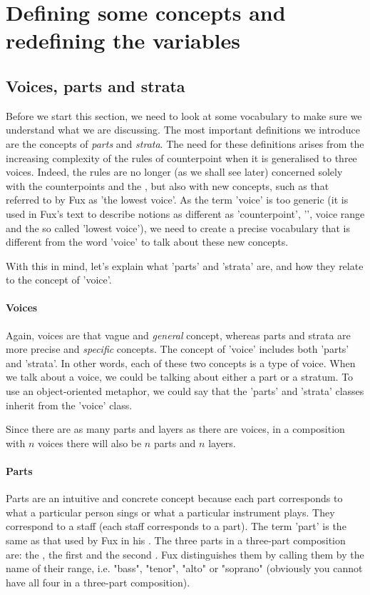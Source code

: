 \chapter{Defining some concepts and redefining the variables} \label{chapter:defining-some-concepts-and-redifing-the-variables}
\section{Voices, parts and strata}\label{section:parts-and-strata}
Before we start this section, we need to look at some vocabulary to make sure we understand what we are discussing. The most important definitions we introduce are the concepts of \textit{parts} and \textit{strata}. The need for these definitions arises from the increasing complexity of the rules of counterpoint when it is generalised to three voices. Indeed, the rules are no longer (as we shall see later) concerned solely with the counterpoints and the \cf, but also with new concepts, such as that referred to by Fux as 'the lowest voice'. As the term 'voice' is too generic (it is used in Fux's text to describe notions as different as 'counterpoint', '\cf', voice range and the so called 'lowest voice'), we need to create a precise vocabulary that is different from the word 'voice' to talk about these new concepts. 


With this in mind, let's explain what 'parts' and 'strata' are, and how they relate to the concept of 'voice'.

\subsubsection{Voices} Again, voices are that vague and \textit{general} concept, whereas parts and strata are more precise and \textit{specific} concepts. The concept of 'voice' includes both 'parts' and 'strata'. In other words, each of these two concepts is a type of voice. When we talk about a voice, we could be talking about either a part or a stratum. To use an object-oriented metaphor, we could say that the 'parts' and 'strata' classes inherit from the 'voice' class.

Since there are as many parts and layers as there are voices, in a composition with $n$ voices there will also be $n$ parts and $n$ layers.

\subsubsection{Parts}
Parts are an intuitive and concrete concept because each part corresponds to what a particular person sings or what a particular instrument plays. They correspond to a staff (each staff corresponds to a part). The term 'part' is the same as that used by Fux in his \gap. The three parts in a three-part composition are: the \cf, the first \cps and the second \cp. Fux distinguishes them by calling them by the name of their range, i.e. "bass", "tenor", "alto" or "soprano" (obviously you cannot have all four in a three-part composition).

